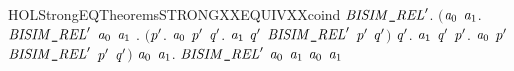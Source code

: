 \newcommand{\HOLStrongEQTheoremsSTRONGXXEQUIVXXcases}{\UseVerbatim{HOLStrongEQTheoremsSTRONGXXEQUIVXXcases}}
\begin{SaveVerbatim}{HOLStrongEQTheoremsSTRONGXXEQUIVXXcoind}
\HOLTokenTurnstile{} \HOLSymConst{\HOLTokenForall{}}\ensuremath{\HOLBoundVar{BISIM\HOLTokenUnderscore{}REL}\sp{\prime}}.
       \ensuremath{(}\HOLSymConst{\HOLTokenForall{}}\ensuremath{\HOLBoundVar{a}\sb{\mathrm{0}}} \ensuremath{\HOLBoundVar{a}\sb{\mathrm{1}}}.
            \ensuremath{\HOLBoundVar{BISIM\HOLTokenUnderscore{}REL}\sp{\prime}} \ensuremath{\HOLBoundVar{a}\sb{\mathrm{0}}} \ensuremath{\HOLBoundVar{a}\sb{\mathrm{1}}} \HOLSymConst{\HOLTokenImp{}}
            \HOLSymConst{\HOLTokenForall{}}.
                \ensuremath{(}\HOLSymConst{\HOLTokenForall{}}\ensuremath{\HOLBoundVar{p}\sp{\prime}}.
                     \ensuremath{\HOLBoundVar{a}\sb{\mathrm{0}}} \HOLTokenTransBegin{}\HOLTokenTransEnd \ensuremath{\HOLBoundVar{p}\sp{\prime}} \HOLSymConst{\HOLTokenImp{}}
                     \HOLSymConst{\HOLTokenExists{}}\ensuremath{\HOLBoundVar{q}\sp{\prime}}. \ensuremath{\HOLBoundVar{a}\sb{\mathrm{1}}} \HOLTokenTransBegin{}\HOLTokenTransEnd \ensuremath{\HOLBoundVar{q}\sp{\prime}} \HOLSymConst{\HOLTokenConj{}} \ensuremath{\HOLBoundVar{BISIM\HOLTokenUnderscore{}REL}\sp{\prime}} \ensuremath{\HOLBoundVar{p}\sp{\prime}} \ensuremath{\HOLBoundVar{q}\sp{\prime}}\ensuremath{)} \HOLSymConst{\HOLTokenConj{}}
                \HOLSymConst{\HOLTokenForall{}}\ensuremath{\HOLBoundVar{q}\sp{\prime}}.
                    \ensuremath{\HOLBoundVar{a}\sb{\mathrm{1}}} \HOLTokenTransBegin{}\HOLTokenTransEnd \ensuremath{\HOLBoundVar{q}\sp{\prime}} \HOLSymConst{\HOLTokenImp{}}
                    \HOLSymConst{\HOLTokenExists{}}\ensuremath{\HOLBoundVar{p}\sp{\prime}}. \ensuremath{\HOLBoundVar{a}\sb{\mathrm{0}}} \HOLTokenTransBegin{}\HOLTokenTransEnd \ensuremath{\HOLBoundVar{p}\sp{\prime}} \HOLSymConst{\HOLTokenConj{}} \ensuremath{\HOLBoundVar{BISIM\HOLTokenUnderscore{}REL}\sp{\prime}} \ensuremath{\HOLBoundVar{p}\sp{\prime}} \ensuremath{\HOLBoundVar{q}\sp{\prime}}\ensuremath{)} \HOLSymConst{\HOLTokenImp{}}
       \HOLSymConst{\HOLTokenForall{}}\ensuremath{\HOLBoundVar{a}\sb{\mathrm{0}}} \ensuremath{\HOLBoundVar{a}\sb{\mathrm{1}}}. \ensuremath{\HOLBoundVar{BISIM\HOLTokenUnderscore{}REL}\sp{\prime}} \ensuremath{\HOLBoundVar{a}\sb{\mathrm{0}}} \ensuremath{\HOLBoundVar{a}\sb{\mathrm{1}}} \HOLSymConst{\HOLTokenImp{}}  \ensuremath{\HOLBoundVar{a}\sb{\mathrm{0}}} \ensuremath{\HOLBoundVar{a}\sb{\mathrm{1}}}
\end{SaveVerbatim}
